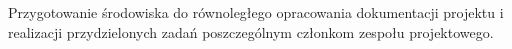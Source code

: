 Przygotowanie środowiska do równoległego opracowania dokumentacji projektu i realizacji przydzielonych zadań poszczególnym członkom zespołu projektowego.








